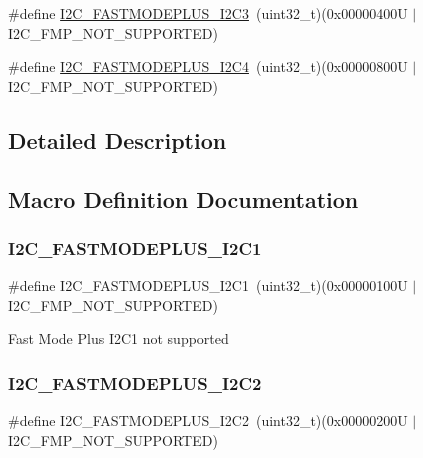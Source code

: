 \begin{DoxyCompactItemize}
\item 
\#define \mbox{\hyperlink{group___i2_c_ex___fast_mode_plus_gafeb5c46154f31ecf6ff77d4ab1d2ee7b}{I2\+C\+\_\+\+F\+A\+S\+T\+M\+O\+D\+E\+P\+L\+U\+S\+\_\+\+I2\+C3}}~(uint32\+\_\+t)(0x00000400\+U $\vert$ I2\+C\+\_\+\+F\+M\+P\+\_\+\+N\+O\+T\+\_\+\+S\+U\+P\+P\+O\+R\+T\+E\+D)
\item 
\#define \mbox{\hyperlink{group___i2_c_ex___fast_mode_plus_ga120ddd3c120c96e72580b7eb7e6870c8}{I2\+C\+\_\+\+F\+A\+S\+T\+M\+O\+D\+E\+P\+L\+U\+S\+\_\+\+I2\+C4}}~(uint32\+\_\+t)(0x00000800\+U $\vert$ I2\+C\+\_\+\+F\+M\+P\+\_\+\+N\+O\+T\+\_\+\+S\+U\+P\+P\+O\+R\+T\+E\+D)
\end{DoxyCompactItemize}


\subsection{Detailed Description}


\subsection{Macro Definition Documentation}
\mbox{\label{group___i2_c_ex___fast_mode_plus_ga3a8064ecfa3b33115f62123f7162770e}} 
\subsubsection{\texorpdfstring{I2C\_FASTMODEPLUS\_I2C1}{I2C\_FASTMODEPLUS\_I2C1}}
{\footnotesize\ttfamily \#define I2\+C\+\_\+\+F\+A\+S\+T\+M\+O\+D\+E\+P\+L\+U\+S\+\_\+\+I2\+C1~(uint32\+\_\+t)(0x00000100\+U $\vert$ I2\+C\+\_\+\+F\+M\+P\+\_\+\+N\+O\+T\+\_\+\+S\+U\+P\+P\+O\+R\+T\+E\+D)}

Fast Mode Plus I2\+C1 not supported \mbox{\label{group___i2_c_ex___fast_mode_plus_gaa5c33513afa036a6f97e9cbf2d61f4b2}} 
\subsubsection{\texorpdfstring{I2C\_FASTMODEPLUS\_I2C2}{I2C\_FASTMODEPLUS\_I2C2}}
{\footnotesize\ttfamily \#define I2\+C\+\_\+\+F\+A\+S\+T\+M\+O\+D\+E\+P\+L\+U\+S\+\_\+\+I2\+C2~(uint32\+\_\+t)(0x00000200\+U $\vert$ I2\+C\+\_\+\+F\+M\+P\+\_\+\+N\+O\+T\+\_\+\+S\+U\+P\+P\+O\+R\+T\+E\+D)}


